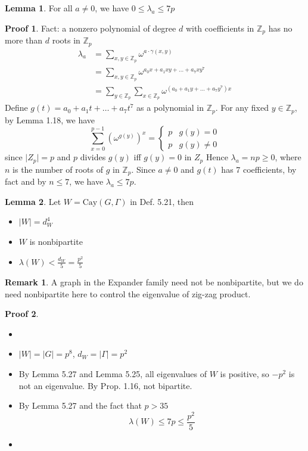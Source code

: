 \documentclass{book}
\newcommand{\Z}{\mathbb{Z}}
\newcommand{\abs}[1]{\lvert #1 \rvert }
\newcommand{\Cay}[1]{\textrm{Cay}( #1 )}
\theoremstyle{definition}
\newtheorem{lemma}{Lemma}[chapter]
\theoremstyle{remarkstyle}
\newtheorem*{remark}{Remark}%
\newtheorem*{myproof}{Proof}%
\begin{document}
\begin{lemma}
    For all $a\neq 0$, we have $0\le \lambda_a\le 7p$
\end{lemma}
\begin{myproof}
    Fact: a nonzero polynomial of degree $d$ with coefficients in $\Z_p$ has no more than $d$ roots in $\Z_p$ 
    \begin{align*}
        \lambda_a &= \sum_{x,y\in \Z_p}\omega^{a\cdot \gamma(x,y)} \\
        &= \sum_{x,y\in \Z_p}\omega^{a_0x + a_1xy + \dots + a_7xy^7} \\
        &= \sum_{y\in \Z_p}\sum_{x\in \Z_p}\omega^{(a_0+a_1y+\dots+a_7y^7)x} 
    \end{align*}
    Define $g(t) = a_0 + a_1t + \dots + a_7t^{7} $ as a polynomial in $\Z_p$. For any fixed $y\in \Z_p$, by Lemma 1.18, we have 
    $$
    \sum_{x=0}^{p-1}(\omega^{g(y)})^x = \left\{
    \begin{array}{ll}
        p & g(y) = 0  \\
        p & g(y) \neq 0 
    \end{array}
    \right.
    $$
    since $\abs{Z_p}=p$ and $p$ divides $g(y)$ iff $g(y)=0$ in $Z_p$ \newline 
    Hence $\lambda_a=np \ge 0$, where $n$ is the number of roots of $g$ in $\Z_p$. Since $a\neq 0$ and $g(t)$ has 7 coefficients, by fact and by $n\le 7$, we have $\lambda_a\le 7p$. \newline
\end{myproof}

\begin{lemma}
    Let $W = \Cay{G,\Gamma}$ in Def. 5.21, then 
    \begin{itemize}
        \item $\abs{W}=d^4_W$
        \item $W$ is nonbipartite
        \item $\lambda(W)<\frac{d_W}{5}=\frac{p^2}{5}$
    \end{itemize}
\end{lemma}
\begin{remark}
    A graph in the Expander family need not be nonbipartite, but we do need  nonbipartite here to control the eigenvalue of zig-zag product.
\end{remark}
\begin{myproof}
    \begin{itemize}
        \item[]
        \item $\abs{W}=\abs{G}=p^8$, $d_W=\abs{\Gamma}=p^2$
        \item By Lemma 5.27 and Lemma 5.25, all eigenvalues of $W$ is positive, so $-p^2$ is not an eigenvalue. By Prop. 1.16, not bipartite. 
        \item By Lemma 5.27 and the fact that $p>35$
        $$
        \lambda(W) \le 7p \le \frac{p^2}{5}
        $$
        \item[] 
    \end{itemize}
\end{myproof}
\end{document}
